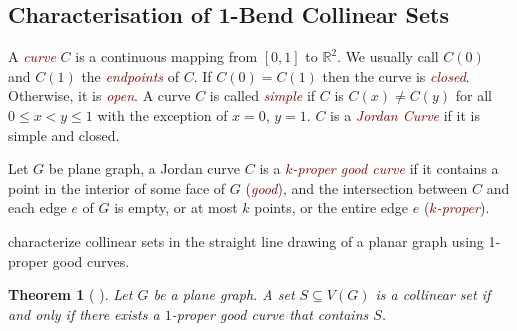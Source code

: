 \documentclass{article}
\newtheorem{thm}{Theorem}
\newcommand{\defin}[1]{\emph{\textcolor{Maroon}{#1}}}
\theoremstyle{definition}
\begin{document}


\subsection{Characterisation of 1-Bend Collinear Sets}
A \defin{curve} $C$ is a continuous mapping from $[0, 1]$ to $\mathbb{R}^2$. We usually call $C(0)$ and $C(1)$ the \defin{endpoints} of $C$. If $C(0)=C(1)$ then  the curve is \defin{closed}. Otherwise, it is \defin{open}. A curve $C$ is called \defin{simple} if $C$ is $C(x) \neq C(y)$ for all $0\le x<y\le 1$ with the exception of $x=0$, $y=1$. $C$ is a \defin{Jordan Curve} if it is simple and closed.

Let $G$ be plane graph, a Jordan curve $C$ is a \defin{$k$-proper good curve} if it contains a point in the interior of some face of $G$ (\defin{good}), and the intersection between $C$ and each edge $e$ of $G$ is empty, or at most $k$ points, or the entire edge $e$ (\defin{$k$-proper}).

\citet{DBLP:journals/jocg/LozzoDFMR18} characterize collinear sets in the straight line drawing of a planar graph using 1-proper good curves.

\begin{thm}[\cite{DBLP:journals/jocg/LozzoDFMR18} ] \label{straightline-topological}
Let $G$ be a plane graph. A set $S \subseteq V(G)$ is a collinear set if and only if there exists a $1$-proper good curve that contains $S$.
\end{thm}
\end{document}
